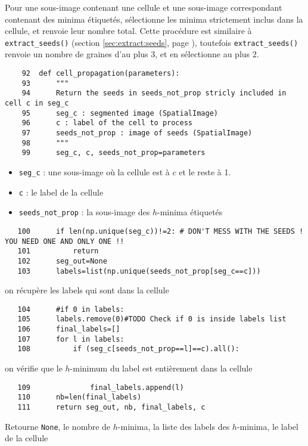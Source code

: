 \documentclass{article}
\def \mycolor {red}
\begin{document}
Pour une sous-image contenant une cellule et une sous-image correspondant contenant des minima \'etiquet\'es, s\'electionne les minima strictement inclus dans la cellule, et renvoie leur nombre total. Cette proc\'edure est similaire \`a \texttt{extract\_seeds()} (section \ref{sec:extract:seeds}, page \pageref{sec:extract:seeds}), toutefois \texttt{extract\_seeds()} renvoie un nombre de graines d'au plus 3, et en s\'electionne au plus 2.
\color{black}

\begin{verbatim}
    92	def cell_propagation(parameters):
    93	    """
    94	    Return the seeds in seeds_not_prop stricly included in cell c in seg_c
    95	    seg_c : segmented image (SpatialImage)
    96	    c : label of the cell to process
    97	    seeds_not_prop : image of seeds (SpatialImage)
    98	    """
    99	    seg_c, c, seeds_not_prop=parameters
\end{verbatim} 
\color{\mycolor}
\begin{itemize}
\itemsep -1ex
\item \verb|seg_c| : une sous-image o\`u la cellule est \`a $c$ et le reste \`a 1.
\item \verb|c| : le label de la cellule
\item \verb|seeds_not_prop| : la sous-image des $h$-minima \'etiquet\'es
\end{itemize}
\color{black}
\begin{verbatim}
   100	    if len(np.unique(seg_c))!=2: # DON'T MESS WITH THE SEEDS ! YOU NEED ONE AND ONLY ONE !!
   101	        return
   102	    seg_out=None
   103	    labels=list(np.unique(seeds_not_prop[seg_c==c]))
\end{verbatim} 
\color{\mycolor}
on r\'ecup\`ere les labels qui sont dans la cellule
\color{black}
\begin{verbatim}
   104	    #if 0 in labels:
   105	    labels.remove(0)#TODO Check if 0 is inside labels list 
   106	    final_labels=[]
   107	    for l in labels:
   108	        if (seg_c[seeds_not_prop==l]==c).all():
\end{verbatim} 
\color{\mycolor}
on v\'erifie que le $h$-minimum du label est enti\`erement dans la cellule 
\color{black}
\begin{verbatim}   
   109	            final_labels.append(l)
   110	    nb=len(final_labels)
   111	    return seg_out, nb, final_labels, c
\end{verbatim}
\color{\mycolor}
Retourne \texttt{None}, le nombre de $h$-minima, la liste des labels des $h$-minima, le label de la cellule
\color{black}
\end{document}
